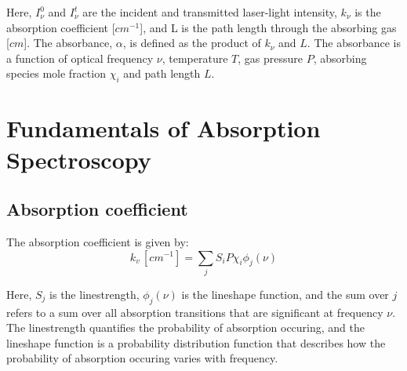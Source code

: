 \noindent Here, $I_\nu^0$ and $I_\nu^t$ are the incident and transmitted laser-light intensity, $k_\nu$ is the absorption coefficient [$cm^{-1}$], and L is the path length through the absorbing gas [$cm$]. The absorbance, $\alpha$, is defined as the product of $k_\nu$ and $L$. The absorbance is a function of optical frequency $\nu$, temperature $T$, gas pressure $P$, absorbing species mole fraction $\chi_i$ and path length $L$. 


\section{Fundamentals of Absorption Spectroscopy}
\subsection{Absorption coefficient}
The absorption coefficient is given by:
\begin{equation}\label{}
k_v\,[cm^{-1}]=\sum_jS_{i}P\chi_i\phi_j(\nu) 
\end{equation}

\noindent Here, $S_j$ is the linestrength, $\phi_j(\nu)$ is the lineshape function, and the sum over $j$ refers to a sum over all absorption transitions that are significant at frequency $\nu$. The linestrength quantifies the probability of absorption occuring, and the lineshape function is a probability distribution function that describes how the probability of absorption occuring varies with frequency.




